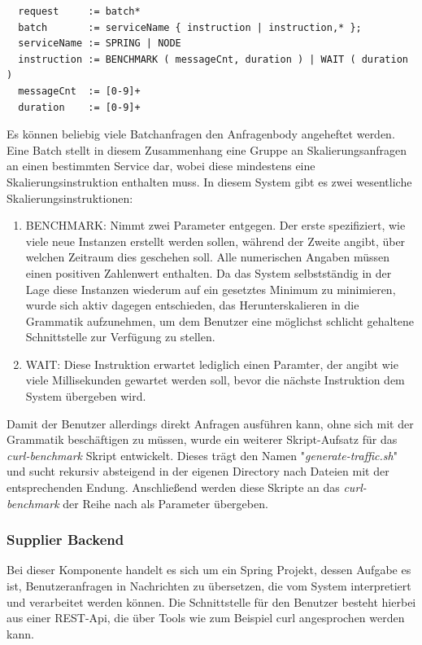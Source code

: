 \label{lst:instruction-grammar}
\begin{verbatim}
  request     := batch*
  batch       := serviceName { instruction | instruction,* };
  serviceName := SPRING | NODE
  instruction := BENCHMARK ( messageCnt, duration ) | WAIT ( duration )
  messageCnt  := [0-9]+
  duration    := [0-9]+
\end{verbatim}

Es können beliebig viele Batchanfragen den Anfragenbody angeheftet werden. Eine Batch stellt in diesem Zusammenhang eine Gruppe an Skalierungsanfragen an einen bestimmten Service dar, wobei diese mindestens eine Skalierungsinstruktion enthalten muss. In diesem System gibt es zwei wesentliche Skalierungsinstruktionen: 

\begin{enumerate}
  \item BENCHMARK: Nimmt zwei Parameter entgegen. Der erste spezifiziert, wie viele neue Instanzen erstellt werden sollen, während der Zweite angibt, über welchen Zeitraum dies geschehen soll. Alle numerischen Angaben müssen einen positiven Zahlenwert enthalten. Da das System selbstständig in der Lage diese Instanzen wiederum auf ein gesetztes Minimum zu minimieren, wurde sich aktiv dagegen entschieden, das Herunterskalieren in die Grammatik aufzunehmen, um dem Benutzer eine möglichst schlicht gehaltene Schnittstelle zur Verfügung zu stellen.
  \item WAIT: Diese Instruktion erwartet lediglich einen Paramter, der angibt wie viele Millisekunden gewartet werden soll, bevor die nächste Instruktion dem System übergeben wird. 
\end{enumerate}


Damit der Benutzer allerdings direkt Anfragen ausführen kann, ohne sich mit der Grammatik beschäftigen zu müssen, wurde ein weiterer Skript-Aufsatz 
für das \emph{curl-benchmark} Skript entwickelt. Dieses trägt den Namen "\emph{generate-traffic.sh}" und sucht rekursiv absteigend in der eigenen Directory nach Dateien mit der entsprechenden Endung. Anschließend werden diese Skripte an das \emph{curl-benchmark} der Reihe nach als Parameter übergeben.





\subsubsection{Supplier Backend}
Bei dieser Komponente handelt es sich um ein Spring Projekt, dessen Aufgabe es ist, Benutzeranfragen in Nachrichten zu übersetzen, die vom System interpretiert und verarbeitet werden können. Die Schnittstelle für den Benutzer besteht hierbei aus einer REST-Api, die über Tools wie zum Beispiel curl angesprochen werden kann.

